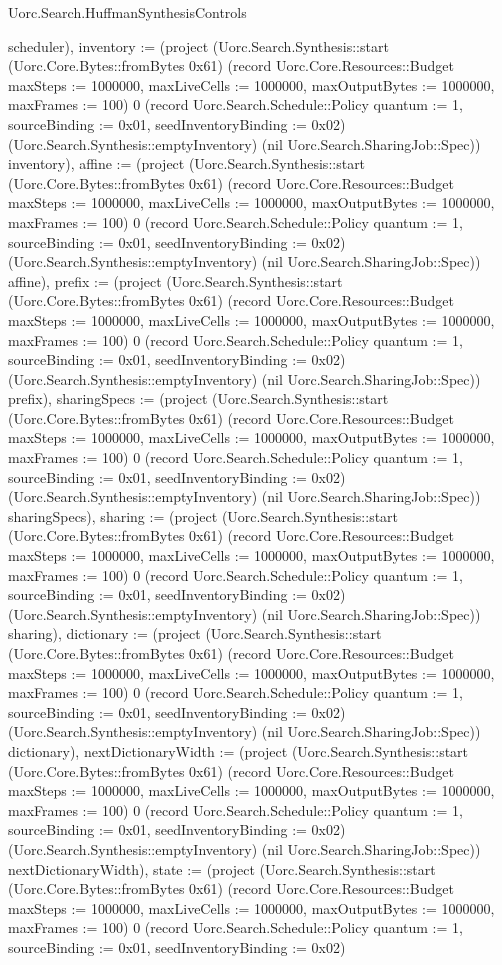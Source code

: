 \begin{lexlean}{Uorc.Search.HuffmanSynthesisControls}
\begin{semanticmodule}
{scheduler), inventory := (project (Uorc.Search.Synthesis::start (Uorc.Core.Bytes::fromBytes 0x61) (record Uorc.Core.Resources::Budget {maxSteps := 1000000, maxLiveCells := 1000000, maxOutputBytes := 1000000, maxFrames := 100}) 0 (record Uorc.Search.Schedule::Policy {quantum := 1, sourceBinding := 0x01, seedInventoryBinding := 0x02}) (Uorc.Search.Synthesis::emptyInventory) (nil Uorc.Search.SharingJob::Spec)) inventory), affine := (project (Uorc.Search.Synthesis::start (Uorc.Core.Bytes::fromBytes 0x61) (record Uorc.Core.Resources::Budget {maxSteps := 1000000, maxLiveCells := 1000000, maxOutputBytes := 1000000, maxFrames := 100}) 0 (record Uorc.Search.Schedule::Policy {quantum := 1, sourceBinding := 0x01, seedInventoryBinding := 0x02}) (Uorc.Search.Synthesis::emptyInventory) (nil Uorc.Search.SharingJob::Spec)) affine), prefix := (project (Uorc.Search.Synthesis::start (Uorc.Core.Bytes::fromBytes 0x61) (record Uorc.Core.Resources::Budget {maxSteps := 1000000, maxLiveCells := 1000000, maxOutputBytes := 1000000, maxFrames := 100}) 0 (record Uorc.Search.Schedule::Policy {quantum := 1, sourceBinding := 0x01, seedInventoryBinding := 0x02}) (Uorc.Search.Synthesis::emptyInventory) (nil Uorc.Search.SharingJob::Spec)) prefix), sharingSpecs := (project (Uorc.Search.Synthesis::start (Uorc.Core.Bytes::fromBytes 0x61) (record Uorc.Core.Resources::Budget {maxSteps := 1000000, maxLiveCells := 1000000, maxOutputBytes := 1000000, maxFrames := 100}) 0 (record Uorc.Search.Schedule::Policy {quantum := 1, sourceBinding := 0x01, seedInventoryBinding := 0x02}) (Uorc.Search.Synthesis::emptyInventory) (nil Uorc.Search.SharingJob::Spec)) sharingSpecs), sharing := (project (Uorc.Search.Synthesis::start (Uorc.Core.Bytes::fromBytes 0x61) (record Uorc.Core.Resources::Budget {maxSteps := 1000000, maxLiveCells := 1000000, maxOutputBytes := 1000000, maxFrames := 100}) 0 (record Uorc.Search.Schedule::Policy {quantum := 1, sourceBinding := 0x01, seedInventoryBinding := 0x02}) (Uorc.Search.Synthesis::emptyInventory) (nil Uorc.Search.SharingJob::Spec)) sharing), dictionary := (project (Uorc.Search.Synthesis::start (Uorc.Core.Bytes::fromBytes 0x61) (record Uorc.Core.Resources::Budget {maxSteps := 1000000, maxLiveCells := 1000000, maxOutputBytes := 1000000, maxFrames := 100}) 0 (record Uorc.Search.Schedule::Policy {quantum := 1, sourceBinding := 0x01, seedInventoryBinding := 0x02}) (Uorc.Search.Synthesis::emptyInventory) (nil Uorc.Search.SharingJob::Spec)) dictionary), nextDictionaryWidth := (project (Uorc.Search.Synthesis::start (Uorc.Core.Bytes::fromBytes 0x61) (record Uorc.Core.Resources::Budget {maxSteps := 1000000, maxLiveCells := 1000000, maxOutputBytes := 1000000, maxFrames := 100}) 0 (record Uorc.Search.Schedule::Policy {quantum := 1, sourceBinding := 0x01, seedInventoryBinding := 0x02}) (Uorc.Search.Synthesis::emptyInventory) (nil Uorc.Search.SharingJob::Spec)) nextDictionaryWidth), state := (project (Uorc.Search.Synthesis::start (Uorc.Core.Bytes::fromBytes 0x61) (record Uorc.Core.Resources::Budget {maxSteps := 1000000, maxLiveCells := 1000000, maxOutputBytes := 1000000, maxFrames := 100}) 0 (record Uorc.Search.Schedule::Policy {quantum := 1, sourceBinding := 0x01, seedInventoryBinding := 0x02}) }
\end{semanticmodule}
\end{lexlean}
